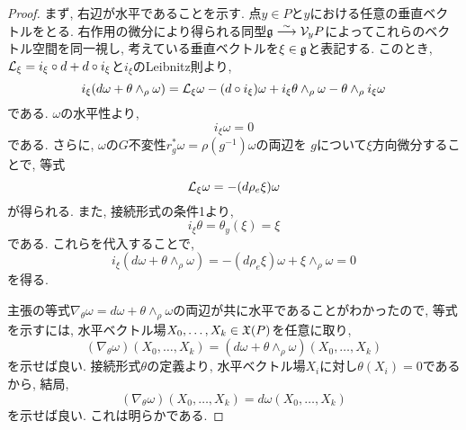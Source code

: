 \begin{proof}
まず, 右辺が水平であることを示す.
点$y \in P$と$y$における任意の垂直ベクトルをとる.
右作用の微分により得られる同型$\mathfrak{g} \stackrel{\sim}{\longrightarrow} \mathcal{V}_yP$によってこれらのベクトル空間を同一視し,
考えている垂直ベクトルを$\xi \in \mathfrak{g}$と表記する.
このとき, $\mathcal{L}_\xi = i_\xi \circ d + d \circ i_\xi$と$i_\xi$のLeibnitz則より,
\begin{equation}
i_\xi (d \omega + \theta \wedge_\rho \omega) =
\mathcal{L}_{\xi} \omega - (d \circ i_\xi) \omega +
i_\xi \theta \wedge_\rho \omega - \theta \wedge_\rho i_\xi \omega
\end{equation}
である.
$\omega$の水平性より,
\begin{equation}
i_\xi \omega = 0
\end{equation}
である.
さらに, $\omega$の$G$不変性$r_g^*\omega = \rho(g^{-1})\omega$の両辺を
$g$について$\xi$方向微分することで, 等式
\begin{equation}
\mathcal{L}_\xi \omega = - (d\rho_e\xi)\omega
\end{equation}
が得られる.
また, 接続形式の条件1より,
\begin{equation}
i_\xi \theta = \theta_y(\xi) = \xi
\end{equation}
である.
これらを代入することで,
\begin{equation}
i_\xi (d \omega + \theta \wedge_\rho \omega) =
-(d\rho_e\xi)\omega + \xi\wedge_\rho\omega = 0
\end{equation}
を得る.

主張の等式$\nabla_\theta \omega = d \omega + \theta \wedge_\rho \omega$の両辺が共に水平であることがわかったので,
等式を示すには, 水平ベクトル場$X_0, \ldots, X_k \in \mathfrak{X}(P)$を任意に取り,
\begin{equation}
(\nabla_\theta \omega)(X_0,\ldots,X_k) =
(d \omega + \theta \wedge_\rho \omega)(X_0,\ldots,X_k)
\end{equation}
を示せば良い.
接続形式$\theta$の定義より, 水平ベクトル場$X_i$に対し$\theta(X_i) = 0$であるから,
結局,
\begin{equation}
(\nabla_\theta \omega)(X_0,\ldots,X_k) =
d\omega(X_0,\ldots,X_k)
\end{equation}
を示せば良い.
これは明らかである.
\end{proof}


